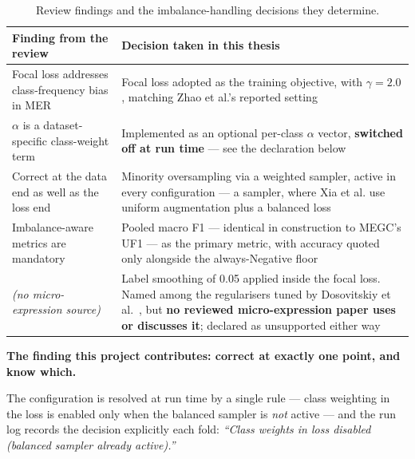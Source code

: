 \begin{table}[htbp]
	\centering
	\footnotesize
	\begin{tabular}{p{6.0cm} p{6.5cm}}
		\hline
		\textbf{Finding from the review} & \textbf{Decision taken in this thesis} \\
		\hline
		Focal loss addresses class-frequency bias in MER~\cite{zhaoS2021} & Focal loss adopted as the training objective, with \textbf{$\gamma = 2.0$}, matching Zhao et al.'s reported setting \\
		$\alpha$ is a dataset-specific class-weight term~\cite{zhaoS2021} & Implemented as an optional per-class $\alpha$ vector, \textbf{switched off at run time} --- see the declaration below \\
		Correct at the data end as well as the loss end~\cite{xia2020a} & Minority oversampling via a weighted sampler, active in every configuration --- a sampler, where Xia et al. use uniform augmentation plus a balanced loss \\
		Imbalance-aware metrics are mandatory~\cite{see2019,liong2016} & Pooled macro F1 --- identical in construction to MEGC's UF1 --- as the primary metric, with accuracy quoted only alongside the always-Negative floor \\
		\textit{(no micro-expression source)} & Label smoothing of 0.05 applied inside the focal loss. Named among the regularisers tuned by Dosovitskiy et al.~\cite{dosovitskiy2021}, but \textbf{no reviewed micro-expression paper uses or discusses it}; declared as unsupported either way \\
		\hline
	\end{tabular}
	\caption[Review findings and the imbalance-handling decisions they determine]{Review findings and the imbalance-handling decisions they determine.}
	\label{tab:imbalance-decisions}
\end{table}

\textbf{The finding this project contributes: correct at exactly one point, and know which.}

The configuration is resolved at run time by a single rule --- class weighting in the loss is enabled only when the balanced sampler is \textit{not} active --- and the run log records the decision explicitly each fold: \textit{``Class weights in loss disabled (balanced sampler already active).''}

